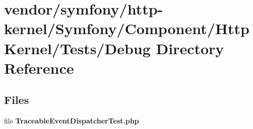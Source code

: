 \section{vendor/symfony/http-\/kernel/\+Symfony/\+Component/\+Http\+Kernel/\+Tests/\+Debug Directory Reference}
\label{dir_596dda77bcd3e0fbbb3112f69c279b28}
\subsection*{Files}
\begin{DoxyCompactItemize}
\item 
file {\bf Traceable\+Event\+Dispatcher\+Test.\+php}
\end{DoxyCompactItemize}
